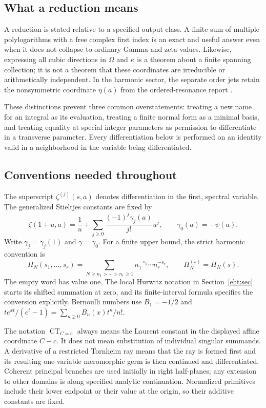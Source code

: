 \documentclass[11pt]{article}
\numberwithin{equation}{section}
\theoremstyle{plain}
\theoremstyle{definition}
\theoremstyle{remark}
\DeclareMathOperator{\CT}{CT}
\begin{document}
\subsection{What a reduction means}

A reduction is stated relative to a specified output class. A finite
sum of multiple polylogarithms with a free complex first index is an
exact and useful answer even when it does not collapse to ordinary
Gamma and zeta values. Likewise, expressing all cubic directions in
$\Omega$ and $\kappa$ is a theorem about a finite spanning collection;
it is not a theorem that these coordinates are irreducible or
arithmetically independent. In the harmonic sector, the separate
order jets retain the nonsymmetric coordinate $\eta(a)$ from the
ordered-resonance report \cite{RepoOrdered}.

These distinctions prevent three common overstatements: treating a
new name for an integral as its evaluation, treating a finite
normal form as a minimal basis, and treating equality at special
integer parameters as permission to differentiate in a transverse
parameter. Every differentiation below is performed on an identity
valid in a neighborhood in the variable being differentiated.

\subsection{Conventions needed throughout}

The superscript $\zeta^{(j)}(s,a)$ denotes differentiation in the
first, spectral variable. The generalized Stieltjes constants are
fixed by
\begin{equation}\label{scope:Stieltjes}
 \zeta(1+u,a)=\frac1u+
       \sum_{j\ge0}\frac{(-1)^j\gamma_j(a)}{j!}u^j,
 \qquad \gamma_0(a)=-\psi(a).
\end{equation}
Write $\gamma_j=\gamma_j(1)$ and $\gamma=\gamma_0$.
For a finite upper bound, the strict harmonic convention is
\[
 H_N(s_1,\ldots,s_r)
   =\sum_{N\ge n_1>\cdots>n_r\ge1}
                          n_1^{-s_1}\cdots n_r^{-s_r},
 \qquad H_N^{(s)}=H_N(s).
\]
The empty word has value one. The local Hurwitz notation in
Section~\ref{eht:sec} starts its shifted summation at zero, and its
finite-interval formula specifies the conversion explicitly.
Bernoulli numbers use $B_1=-1/2$ and
$te^{xt}/(e^t-1)=\sum_{n\ge0}B_n(x)t^n/n!$.

The notation $\CT_{C=c}$ always means the Laurent constant in the
displayed affine coordinate $C-c$. It does not mean substitution of
individual singular summands. A derivative of a restricted Tornheim
ray means that the ray is formed first and its resulting one-variable
meromorphic germ is then continued and differentiated. Coherent
principal branches are used initially in right half-planes; any
extension to other domains is along specified analytic continuation.
Normalized primitives include their lower endpoint or their value at
the origin, so their additive constants are fixed.
\end{document}
